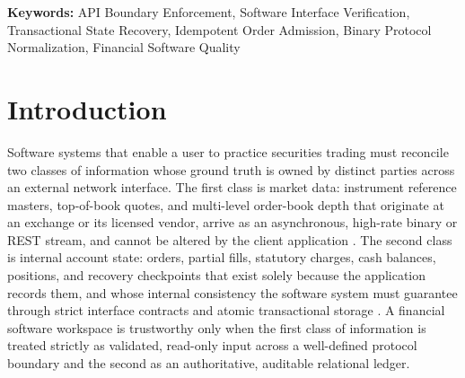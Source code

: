 \documentclass[12pt]{article}
\newenvironment{IEEEkeywords}{\par\vspace{4pt}\noindent\textbf{Keywords:} }{\par\vspace{4pt}}
\begin{document}
\begin{IEEEkeywords}
API Boundary Enforcement, Software Interface Verification, Transactional State Recovery, Idempotent Order Admission, Binary Protocol Normalization, Financial Software Quality
\end{IEEEkeywords}

\section{Introduction}

Software systems that enable a user to practice securities trading must reconcile two classes of information whose ground truth is owned by distinct parties across an external network interface. The first class is market data: instrument reference masters, top-of-book quotes, and multi-level order-book depth that originate at an exchange or its licensed vendor, arrive as an asynchronous, high-rate binary or REST stream, and cannot be altered by the client application \cite{harris2003,hasbrouck2007,gould2013}. The second class is internal account state: orders, partial fills, statutory charges, cash balances, positions, and recovery checkpoints that exist solely because the application records them, and whose internal consistency the software system must guarantee through strict interface contracts and atomic transactional storage \cite{gray1993,kleppmann2017}. A financial software workspace is trustworthy only when the first class of information is treated strictly as validated, read-only input across a well-defined protocol boundary and the second as an authoritative, auditable relational ledger.
\end{document}
